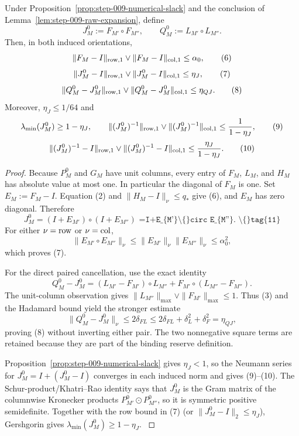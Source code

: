 \begin{proposition}\label{prop:step-009-pair-reserves}
Under Proposition~\ref{prop:step-009-numerical-slack}
and the conclusion of Lemma~\ref{lem:step-009-raw-expansion}, define
\[
J_M^0:=F_{M'}\circ F_{M''},\qquad
Q_M^0:=L_{M'}\circ L_{M''}.
\]
Then, in both induced orientations,
\[
\|F_M-I\|_{\rm row,1}\vee\|F_M-I\|_{\rm col,1}\le\alpha_0, \tag{6}
\]
\[
\|J_M^0-I\|_{\rm row,1}\vee\|J_M^0-I\|_{\rm col,1}\le\eta_J, \tag{7}
\]
\[
\|Q_M^0-J_M^0\|_{\rm row,1}\vee\|Q_M^0-J_M^0\|_{\rm col,1}
\le\eta_{QJ}. \tag{8}
\]
Moreover, \(\eta_J\le1/64\) and
\[
\lambda_{\min}(J_M^0)\ge1-\eta_J,\qquad
\|(J_M^0)^{-1}\|_{\rm row,1}\vee\|(J_M^0)^{-1}\|_{\rm col,1}
\le\frac1{1-\eta_J}, \tag{9}
\]
\[
\|(J_M^0)^{-1}-I\|_{\rm row,1}\vee\|(J_M^0)^{-1}-I\|_{\rm col,1}
\le\frac{\eta_J}{1-\eta_J}. \tag{10}
\]

\begin{proof}

Because \(P_M^0\) and \(G_M\) have unit columns, every entry of \(F_M\),
\(L_M\), and \(H_M\) has absolute value at most one. In particular the
diagonal of \(F_M\) is one. Set \(E_M:=F_M-I\). Equation (2) and
\(\|H_M-I\|_\nu\le q_*\) give (6), and \(E_M\) has zero diagonal. Therefore
\[
J_M^0=(I+E_{M'})\circ(I+E_{M''})
\texttt{  =I+E\_\{M'\}\textbackslash\{\}circ E\_\{M''\}. \textbackslash\{\}tag\{11\}}
\]
For either \(\nu={\rm row}\) or \(\nu={\rm col}\),
\[
\|E_{M'}\circ E_{M''}\|_\nu
\le\|E_{M'}\|_\nu\|E_{M''}\|_\nu
\le\alpha_0^2,
\]
which proves (7).

For the direct paired cancellation, use the exact identity
\[
Q_M^0-J_M^0
 =(L_{M'}-F_{M'})\circ L_{M''}
  +F_{M'}\circ(L_{M''}-F_{M''}). \tag{12}
\]
The unit-column observation gives
\(\|L_{M''}\|_{\max}\vee\|F_{M'}\|_{\max}\le1\). Thus (3) and the
Hadamard bound yield the stronger estimate
\[
\|Q_M^0-J_M^0\|_\nu\le2\delta_{FL}
\le2\delta_{FL}+\delta_L^2+\delta_F^2=\eta_{QJ},
\]
proving (8) without inverting either pair. The two nonnegative square terms
are retained because they are part of the binding reserve definition.

Proposition~\ref{prop:step-009-numerical-slack} gives \(\eta_J<1\), so the
Neumann series for \(J_M^0=I+(J_M^0-I)\) converges in each induced norm and
gives (9)--(10).
The Schur-product/Khatri--Rao identity says that \(J_M^0\) is the Gram
matrix of the columnwise Kronecker products
\(P_{M'}^0\odot P_{M''}^0\), so it is symmetric positive semidefinite.
Together with the row bound in (7) (or
\(\|J_M^0-I\|_2\le\eta_J\)), Gershgorin gives
\(\lambda_{\min}(J_M^0)\ge1-\eta_J\). \(\)


\end{proof}
\end{proposition}
